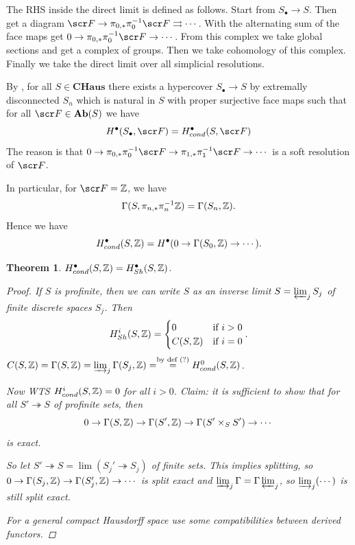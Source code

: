 \documentclass[A4paper, british, reqno]{amsart}
\theoremstyle{darkgreentheorem}
\newtheorem{thm}{Theorem}[section]
\theoremstyle{darkbluedefinition}
\theoremstyle{darkredexample}
\theoremstyle{remark}
\newcommand{\CHaus}{\mathbf{CHaus}}
\newcommand{\1}{\mathbbm{1}}
\newcommand{\fp}[1]{\times_{#1}}
\newcommand{\grd}{^{\bullet}}
\begin{document}
The RHS inside the direct limit is defined as follows.
Start from $S_{\bullet}\to S$.
Then get a diagram $\F\to \pi_{0,*}\pi_{0}^{-1}\F\rightrightarrows \cdots $.
With the alternating sum of the face maps get $0\to \pi_{0,*}\pi_{0}^{-1}\F\to \cdots $.
From this complex we take global sections and get a complex of groups.
Then we take cohomology of this complex.
Finally we take the direct limit over all simplicial resolutions.

By \cite[Theorems 2.3, 3.10-11]{dyc76}, for all $S\in \CHaus$ there exists a hypercover $S_{\bullet}\to S$ by extremally disconnected $S_{n}$ which is natural in $S$ with proper surjective face maps such that for all $\F\in \Ab(S)$ we have
\[ H\grd(S_{\bullet},\F)=H\grd_{cond}(S,\F) \]
The reason is that $0\to \pi_{0,*}\pi_{0}^{-1}\F\to \pi_{1,*}\pi_{1}^{-1}\F\to \cdots $ is a soft resolution of $\F$.

In particular, for $\F=\Z$, we have
\[ \Gamma(S,\pi_{n,*}\pi_{n}^{-1}\mathbb{Z})=\Gamma(S_{n},\mathbb{Z}). \]
Hence we have
\[ H_{cond}\grd(S,\Z)=H\grd(0\to \Gamma(S_{0},\Z)\to \cdots ).\]

\begin{thm}
    $H\grd_{cond}(S,\Z)=H\grd_{Sh}(S,\Z)$.
    \begin{proof}
	If $S$ is profinite, then we can write $S$ as an inverse limit $S=\varprojlim_{j} S_{j}$ of finite discrete spaces $S_{j}$.
	Then
	\[ H^{i}_{Sh}(S,\mathbb{Z})=\begin{cases} 0 & \text{if } i>0 \\ C(S,\mathbb{Z}) & \text{if } i=0 \end{cases}. \]
	    \marginnote{\dbend}$C(S,\mathbb{Z})=\Gamma(S,\mathbb{Z})= \varinjlim_{j}\Gamma(S_{j},\mathbb{Z})=\overset{\text{by def } (?)}{=} H^{0}_{cond}(S,\mathbb{Z})$.
	
	Now WTS $H_{cond}^{i}(S,\mathbb{Z})=0$ for all $i>0$.
	\marginnote{\dbend} Claim: it is sufficient to show that for all $S'\twoheadrightarrow S$ of profinite sets, then
	\[ 0\to \Gamma(S,\Z)\to \Gamma(S',\Z)\to \Gamma(S'\fp{S}S')\to \cdots \]
	is exact.

	So let $S'\twoheadrightarrow S=\lim(S_{j}'\twoheadrightarrow S_{j})$ of finite sets.
	This implies splitting, so $0\to \Gamma(S_{j},\mathbb{Z})\to \Gamma(S'_{j},\mathbb{Z})\to \cdots $ is split exact and $\varinjlim_{j}\Gamma=\Gamma \varprojlim_{j}$, so $\varinjlim_{j}(\cdots)$ is still split exact.
	
	For a general compact Hausdorff space use some compatibilities between derived functors.
    \end{proof}
\end{thm}
\end{document}
